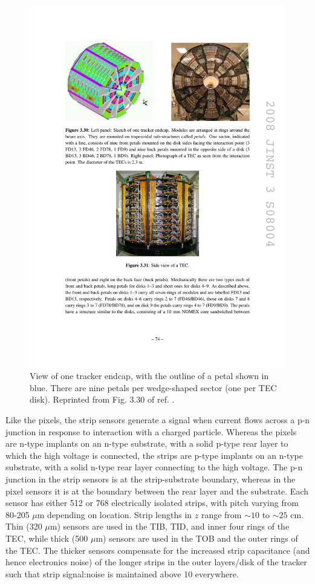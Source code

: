 \documentclass[dissertation.tex]{subfiles}
\begin{document}
\begin{figure}
	\centering
	\includegraphics[scale=1.0]{tracker_TEC}
	\caption{View of one tracker endcap, with the outline of a petal shown in blue.  There are nine petals per wedge-shaped sector (one per TEC disk).  Reprinted from Fig. 3.30 of ref. \cite{1748-0221-3-08-S08004}.}
	\label{fig:tracker_TEC}
\end{figure}

Like the pixels, the strip sensors generate a signal when current flows across a p-n junction in response to interaction with a charged particle.  Whereas the pixels are n-type implants on an n-type substrate, with a solid p-type rear layer to which the high voltage is connected, the strips are p-type implants on an n-type substrate, with a solid n-type rear layer connecting to the high voltage.  The p-n junction in the strip sensors is at the strip-substrate boundary, whereas in the pixel sensors it is at the boundary between the rear layer and the substrate.  Each sensor has either 512 or 768 electrically isolated strips, with pitch varying from 80-205 $\mu\mbox{m}$ depending on location.  Strip lengths in $z$ range from $\sim10$ to $\sim25$ cm.  Thin (320 $\mu\mbox{m}$) sensors are used in the TIB, TID, and inner four rings of the TEC, while thick (500 $\mu\mbox{m}$) sensors are used in the TOB and the outer rings of the TEC.  The thicker sensors compensate for the increased strip capacitance (and hence electronics noise) of the longer strips in the outer layers/disk of the tracker such that strip signal:noise is maintained above 10 everywhere.
\end{document}
